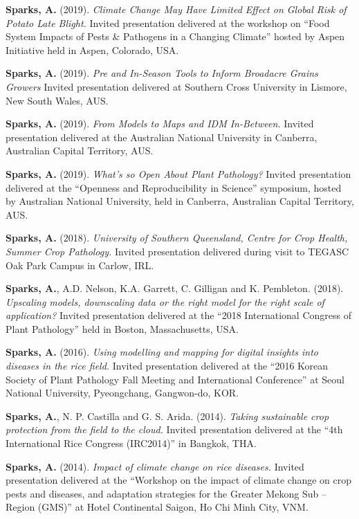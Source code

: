 \documentclass[11pt, a4paper]{awesome-cv}
\begin{document}
\textbf{Sparks, A.} (2019). \emph{Climate Change May Have Limited Effect on Global Risk of Potato Late Blight.} Invited presentation delivered at the workshop on ``Food System Impacts of Pests \& Pathogens in a Changing Climate'' hosted by Aspen Initiative held in Aspen, Colorado, USA.

\textbf{Sparks, A.} (2019). \emph{Pre and In-Season Tools to Inform Broadacre Grains Growers} Invited presentation delivered at Southern Cross University in Lismore, New South Wales, AUS.

\textbf{Sparks, A.} (2019). \emph{From Models to Maps and IDM In-Between.} Invited presentation delivered at the Australian National University in Canberra, Australian Capital Territory, AUS.

\textbf{Sparks, A.} (2019). \emph{What's so Open About Plant Pathology?} Invited presentation delivered at the ``Openness and Reproducibility in Science'' symposium, hosted by Australian National University, held in Canberra, Australian Capital Territory, AUS.

\textbf{Sparks, A.} (2018). \emph{University of Southern Queensland, Centre for Crop Health, Summer Crop Pathology.} Invited presentation delivered during visit to TEGASC Oak Park Campus in Carlow, IRL.

\textbf{Sparks, A.}, A.D. Nelson, K.A. Garrett, C. Gilligan and K. Pembleton. (2018). \emph{Upscaling models, downscaling data or the right model for the right scale of application?} Invited presentation delivered at the ``2018 International Congress of Plant Pathology'' held in Boston, Massachusetts, USA.

\textbf{Sparks, A.} (2016). \emph{Using modelling and mapping for digital insights into diseases in the rice field.} Invited presentation delivered at the ``2016 Korean Society of Plant Pathology Fall Meeting and International Conference'' at Seoul National University, Pyeongchang, Gangwon-do, KOR.

\textbf{Sparks, A.}, N. P. Castilla and G. S. Arida. (2014). \emph{Taking sustainable crop protection from the field to the cloud.} Invited presentation delivered at the ``4th International Rice Congress (IRC2014)'' in Bangkok, THA.

\textbf{Sparks, A.} (2014). \emph{Impact of climate change on rice diseases.} Invited presentation delivered at the ``Workshop on the impact of climate change on crop pests and diseases, and adaptation strategies for the Greater Mekong Sub -- Region (GMS)'' at Hotel Continental Saigon, Ho Chi Minh City, VNM.
\end{document}
